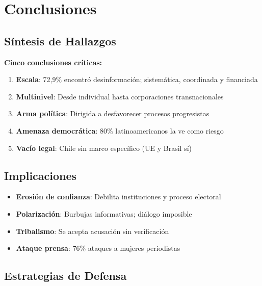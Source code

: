 
\hypertarget{sec5}{\section{Conclusiones}}\label{sec5}

\subsection{Síntesis de Hallazgos}

\begin{keypoint}
\textbf{Cinco conclusiones críticas:}
\begin{enumerate}
    \itemsep=0.15cm
    \item \textbf{Escala}: 72,9\% encontró desinformación; sistemática, coordinada y financiada
    \item \textbf{Multinivel}: Desde individual hasta corporaciones transnacionales
    \item \textbf{Arma política}: Dirigida a desfavorecer procesos progresistas
    \item \textbf{Amenaza democrática}: 80\% latinoamericanos la ve como riesgo
    \item \textbf{Vacío legal}: Chile sin marco específico (UE y Brasil sí)
\end{enumerate}
\end{keypoint}

\subsection{Implicaciones}

\begin{itemize}
    \itemsep=0.12cm
    \item \textbf{Erosión de confianza}: Debilita instituciones y proceso electoral
    \item \textbf{Polarización}: Burbujas informativas; diálogo imposible
    \item \textbf{Tribalismo}: Se acepta acusación sin verificación
    \item \textbf{Ataque prensa}: 76\% ataques a mujeres periodistas
\end{itemize}

\subsection{Estrategias de Defensa}

